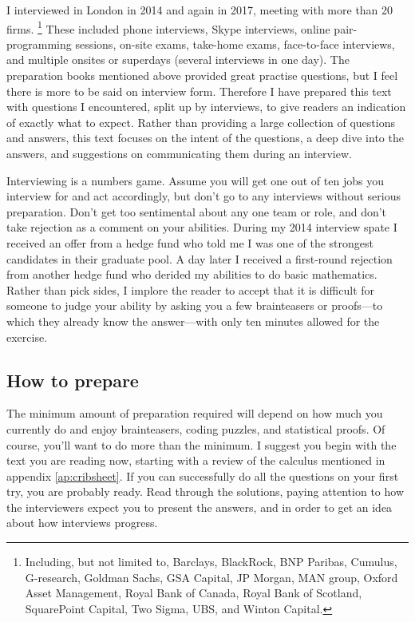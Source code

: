 \documentclass[a4paper]{article}
\begin{document}
I interviewed in London in 2014 and again in 2017,
meeting with more than 20 firms.%
\footnote{Including, but not limited to,
  Barclays,
  BlackRock,
  BNP Paribas,
  Cumulus,
  G-research,
  Goldman Sachs,
  GSA Capital,
  JP Morgan,
  MAN group,
  Oxford Asset Management,
  Royal Bank of Canada,
  Royal Bank of Scotland,
  SquarePoint Capital,
  Two Sigma,
  UBS,
and
  Winton Capital.
}
These included phone interviews, Skype interviews, online pair-programming sessions, on-site exams, take-home exams, face-to-face interviews, and multiple onsites or superdays (several interviews in one day).
The preparation books mentioned above provided great practise questions, but I feel there is more to be said on interview form.
Therefore I have prepared this text with questions I encountered, split up by interviews, to give readers an indication of exactly what to expect.
Rather than providing a large collection of questions and answers, this text focuses on the intent of the questions, a deep dive into the answers, and suggestions on communicating them during an interview.

Interviewing is a numbers game.
Assume you will get one out of ten jobs you interview for and act accordingly, but don't go to any interviews without serious preparation.
Don't get too sentimental about any one team or role, and don't take rejection as a comment on your abilities.
During my 2014 interview spate I received an offer from a hedge fund who told me I was one of the strongest candidates in their graduate pool.
A day later I received a first-round rejection from another hedge fund who derided my abilities to do basic mathematics.
Rather than pick sides, I implore the reader to accept that it is difficult for someone to judge your ability by asking you a few brainteasers or proofs---to which they already know the answer---with only ten minutes allowed for the exercise.

{}
\subsection*{How to prepare}

The minimum amount of preparation required will depend on how much you currently do and enjoy brainteasers, coding puzzles, and statistical proofs.
Of course, you'll want to do more than the minimum.
I suggest you begin with the text you are reading now, starting with a review of the calculus mentioned in appendix \ref{ap:cribsheet}.
If you can successfully do all the questions on your first try, you are probably ready.
Read through the solutions, paying attention to how the interviewers expect you to present the answers, and in order to get an idea about how interviews progress.
\end{document}
